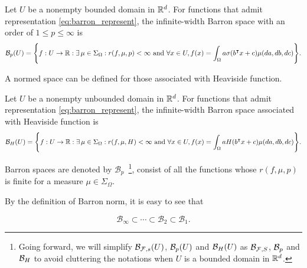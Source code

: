 \begin{definition}
    \label{def:barron_space}
    Let $U$ be a nonempty bounded domain in $\mathbb{R}^d$. For functions that admit
    representation \eqref{eq:barron_represent}, the infinite-width Barron space
    with an order of $1 \leq p \leq \infty$ is
    \begin{equation}
        \mathcal{B}_p(U) = \Bigg\{
            f: U \to \mathbb{R} : \exists\, \mu \in \Sigma_{\Omega}: 
            r(f, \mu, p) < \infty \textnormal{ and }
            \forall x \in U, f(x) = \int_{\Omega} a \sigma(b{}^{\intercal} x + c) \mu(da, db, dc)
        \Bigg\}.
    \end{equation}
\end{definition}

A normed space can be defined for those associated with Heaviside function.

\begin{definition}
    \label{def:heaviside_space}
    Let $U$ be a nonempty unbounded domain in $\mathbb{R}^d$. For functions that admit
    representation \eqref{eq:barron_represent}, the infinite-width Barron space
    associated with Heaviside function is
    \begin{equation}
        \label{def:heaviside_space}
        \mathcal{B}_H(U) = \Bigg\{
            f: U \to \mathbb{R} : \exists\, \mu \in \Sigma_{\Omega}:
            r(f, \mu, H) < \infty \textnormal{ and }
            \forall x \in U, f(x) = \int_{\Omega} a H(b{}^{\intercal} x + c) \mu(da, db, dc)
        \Bigg\}.
    \end{equation}
\end{definition}

Barron spaces are denoted by $\mathcal{B}_p$~\footnote{
    Going forward, we will simplify $\mathcal{B}_{\mathcal{F}, s}(U)$, $\mathcal{B}_p(U)$ 
    and $\mathcal{B}_H(U)$ as $\mathcal{B}_{\mathcal{F}, S}$, $\mathcal{B}_p$ and 
    $\mathcal{B}_H$ to avoid cluttering the notations when $U$ is a bounded domain
    in $\mathbb{R}^d$.
}, consist of all the functions whose $r(f, \mu, p)$ is finite for a measure 
$\mu \in \Sigma_{\Omega}$.

\begin{proposition}
    By the definition of Barron norm, it is easy to see that

    \begin{equation}
        \mathcal{B}_{\infty} \subset \cdots \subset \mathcal{B}_{2} 
        \subset \mathcal{B}_1.
    \end{equation}
\end{proposition}


